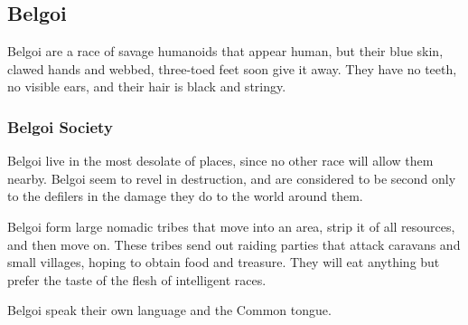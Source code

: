 \subsection{Belgoi}
Belgoi are a race of savage humanoids that appear human, but their blue skin, clawed hands and webbed, three-toed feet soon give it away. They have no teeth, no visible ears, and their hair is black and stringy.

\subsubsection{Belgoi Society}
Belgoi live in the most desolate of places, since no other race will allow them nearby. Belgoi seem to revel in destruction, and are considered to be second only to the defilers in the damage they do to the world around them.

Belgoi form large nomadic tribes that move into an area, strip it of all resources, and then move on. These tribes send out raiding parties that attack caravans and small villages, hoping to obtain food and treasure. They will eat anything but prefer the taste of the flesh of intelligent races.

Belgoi speak their own language and the Common tongue.


